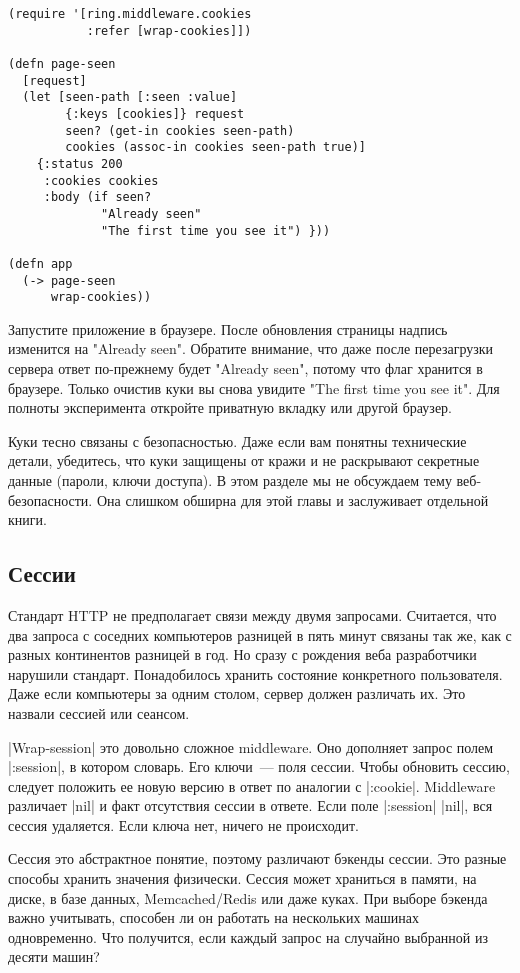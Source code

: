 \begin{verbatim}
(require '[ring.middleware.cookies
           :refer [wrap-cookies]])

(defn page-seen
  [request]
  (let [seen-path [:seen :value]
        {:keys [cookies]} request
        seen? (get-in cookies seen-path)
        cookies (assoc-in cookies seen-path true)]
    {:status 200
     :cookies cookies
     :body (if seen?
             "Already seen"
             "The first time you see it") }))

(defn app
  (-> page-seen
      wrap-cookies))
\end{verbatim}

Запустите приложение в браузере. После обновления страницы надпись изменится на
"Already seen". Обратите внимание, что даже после перезагрузки сервера ответ
по-прежнему будет "Already seen", потому что флаг хранится в браузере. Только
очистив куки вы снова увидите "The first time you see it". Для полноты
эксперимента откройте приватную вкладку или другой браузер.

Куки тесно связаны с безопасностью. Даже если вам понятны технические детали,
убедитесь, что куки защищены от кражи и не раскрывают секретные данные (пароли,
ключи доступа). В этом разделе мы не обсуждаем тему веб-безопасности. Она
слишком обширна для этой главы и заслуживает отдельной книги.

\subsection{Сессии}

Стандарт HTTP не предполагает связи между двумя запросами. Считается, что два
запроса с соседних компьютеров разницей в пять минут связаны так же, как с
разных континентов разницей в год. Но сразу с рождения веба разработчики
нарушили стандарт. Понадобилось хранить состояние конкретного пользователя. Даже
если компьютеры за одним столом, сервер должен различать их. Это назвали сессией
или сеансом.

\spverb|Wrap-session| это довольно сложное middleware. Оно дополняет запрос полем
\spverb|:session|, в котором словарь. Его ключи~--- поля сессии. Чтобы обновить сессию,
следует положить ее новую версию в ответ по аналогии с \spverb|:cookie|. Middleware
различает \spverb|nil| и факт отсутствия сессии в ответе. Если поле \spverb|:session| \spverb|nil|, вся
сессия удаляется. Если ключа нет, ничего не происходит.

Сессия это абстрактное понятие, поэтому различают бэкенды сессии. Это разные
способы хранить значения физически. Сессия может храниться в памяти, на диске, в
базе данных, Memcached/Redis или даже куках. При выборе бэкенда важно учитывать,
способен ли он работать на нескольких машинах одновременно. Что получится, если
каждый запрос на случайно выбранной из десяти машин?

